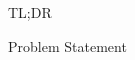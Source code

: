 \documentclass[final,12pt]{beamer}
\newlength{\colwidth}
\newcommand{\E}{\mathbb{E}}    %
\newcommand{\R}{\mathbb{R}}    %
\renewcommand{\mid}{\,|\,}
\DeclareMathOperator{\R}{\mathbb{R}}
\DeclareMathOperator{\E}{\mathbb{E}}
\newcommand{\modeInd}{\ensuremath{k}}
\newcommand{\StateDim}{\ensuremath{{D_x}}}
\newcommand{\ControlDim}{\ensuremath{{D_u}}}
\newcommand{\ModeInd}{\ensuremath{\MakeUppercase{\modeInd}}}
\newcommand{\mode}[1]{\ensuremath{#1_{\modeInd}}}
\newcommand{\state}{\ensuremath{\mathbf{x}}}
\newcommand{\control}{\ensuremath{\mathbf{u}}}
\newcommand{\modeVar}{\ensuremath{\alpha}}
\newcommand{\timeInd}{\ensuremath{t}}
\newcommand{\TimeInd}{\ensuremath{\MakeUppercase{\timeInd}}}
\newcommand{\dynamicsFunc}{\ensuremath{f}}
\newcommand{\policy}{\ensuremath{\pi}}
\newcommand{\desiredMode}{\ensuremath{\modeInd^{*}}}
\newcommand{\stateDomain}{\ensuremath{\mathcal{S}}}
\newcommand{\controlDomain}{\ensuremath{\mathcal{A}}}
\renewcommand{\state}{\ensuremath{\mathbf{s}}}
\renewcommand{\mode}[1]{\ensuremath{#1_{\modeInd}}}
\renewcommand{\control}{\ensuremath{\mathbf{a}}}
\newcommand{\rewardFunc}{\ensuremath{r}}
\begin{document}
\begin{frame}[t]
\begin{columns}[t]
\begin{column}{\colwidth}
\begin{alertblock}{TL;DR}
  \end{alertblock}

  \begin{block}{Problem Statement}





\end{block}
\end{column}
\end{columns}
\end{frame}
\end{document}
